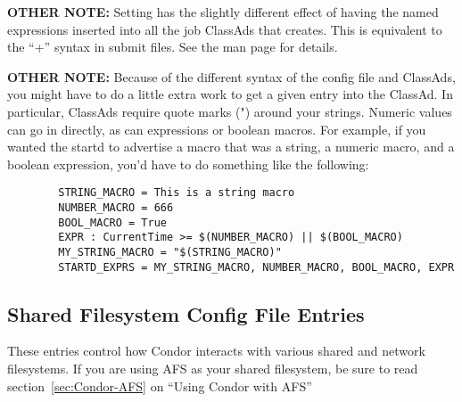 \begin{description}
  \textbf{OTHER NOTE:} Setting  has the slightly
  different effect of having the named expressions inserted into all
  the job ClassAds that  creates.  This is equivalent
  to the ``+'' syntax in submit files.  See the
   man page for details.  

  \textbf{OTHER NOTE:} Because of the different syntax of the config
  file and ClassAds, you might have to do a little extra work to get a
  given entry into the ClassAd.  In particular, ClassAds require quote
  marks (") around your strings.  Numeric values can go in directly,
  as can expressions or boolean macros.  For example, if you wanted
  the startd to advertise a macro that was a string, a numeric macro,
  and a boolean expression, you'd have to do something like the
  following:

\begin{verbatim}
        STRING_MACRO = This is a string macro
        NUMBER_MACRO = 666
        BOOL_MACRO = True
        EXPR : CurrentTime >= $(NUMBER_MACRO) || $(BOOL_MACRO)
        MY_STRING_MACRO = "$(STRING_MACRO)"
        STARTD_EXPRS = MY_STRING_MACRO, NUMBER_MACRO, BOOL_MACRO, EXPR
\end{verbatim}

\end{description}

\subsection{Shared Filesystem Config File Entries}
\label{sec:Shared-Filesystem-Config-File-Entries}

These entries control how Condor interacts with various shared and
network filesystems.  If you are using AFS as your shared filesystem,
be sure to read section~\ref{sec:Condor-AFS} on ``Using Condor with
AFS''

